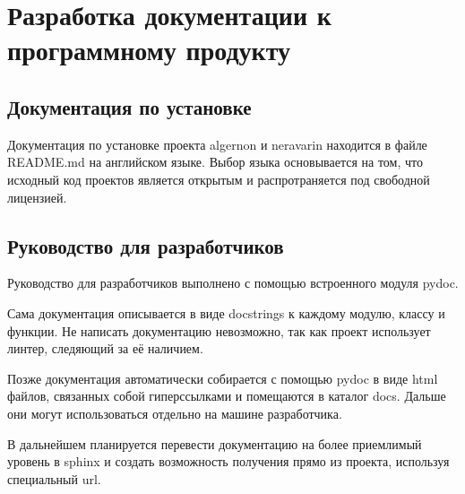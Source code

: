 \section{Разработка документации к программному продукту}

\vspace{-0.9cm}

\tocless\subsection{Документация по установке}

Документация по установке проекта algernon и neravarin находится в файле README.md на английском языке.
Выбор языка основывается на том, что исходный код проектов является открытым и распротраняется под свободной лицензией.

\tocless\subsection{Руководство для разработчиков}

Руководство для разработчиков выполнено с помощью встроенного модуля pydoc.

Сама документация описывается в виде docstrings к каждому модулю, классу и функции. Не написать документацию невозможно, так как
проект использует линтер, следяющий за её наличием.

Позже документация автоматически собирается с помощью pydoc в виде html файлов, связанных собой гиперссылками и помещаются в каталог
docs. Дальше они могут использоваться отдельно на машине разработчика.

В дальнейшем планируется перевести документацию на более приемлимый уровень в sphinx и создать возможность получения прямо из проекта,
используя специальный url.
